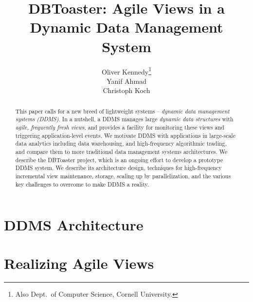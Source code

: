 \documentclass{sig-alternate}
\begin{document}
\title{DBToaster: Agile Views in a\\Dynamic Data Management System}
\author{
\alignauthor
Oliver Kennedy\thanks{Also Dept.\ of Computer Science, Cornell University.}\\
\alignauthor
Yanif Ahmad\\
\alignauthor
Christoph Koch\\
}
\maketitle

\begin{abstract}
This paper calls for a new breed of lightweight systems --
{\em dynamic data management systems (DDMS)}\/.
In a nutshell,
a DDMS manages large {\em dynamic data structures}\/ with 
{\em agile, frequently fresh views}\/, and provides a facility for monitoring
these views and triggering application-level events.
%
We motivate DDMS with applications in large-scale data analytics
including data warehousing, and high-frequency algorithmic trading,
and compare them to more traditional data management systems 
architectures.
%
We describe the DBToaster project, which is an ongoing effort to
develop a prototype DDMS system. We describe its architecture
design, techniques for high-frequency incremental view maintenance,
storage, scaling up by parallelization, and
the various key challenges to overcome to make DDMS a reality.
\end{abstract}



\section{DDMS Architecture}

\label{sec:overview}


\section{Realizing Agile Views}
\label{sec:dbtoaster}

\end{document}
